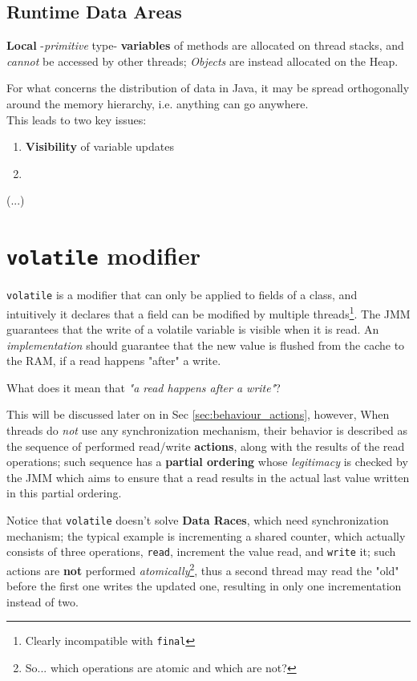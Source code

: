 \subsection{Runtime Data Areas}
\textbf{Local} {-}\textit{primitive} type{-} \textbf{variables} of methods are allocated on thread stacks,
and \textit{cannot} be accessed by other threads;
\textit{Objects} are instead allocated on the Heap. 
\nl

For what concerns the distribution of data in Java,
it may be spread orthogonally around the memory hierarchy, 
i.e. anything can go anywhere.\\
This leads to two key issues:
\begin{enumerate}
   \item \textbf{Visibility} of variable updates
   \item 
\end{enumerate}

(...)

\section{\texttt{volatile} modifier}
\lstinline|volatile| is a modifier that can only be applied to fields of a class,
and intuitively it declares that a field can be modified by multiple threads\footnote{Clearly incompatible with \lstinline|final|}.
The JMM guarantees that the write of a volatile variable is visible when it is read.
An \textit{implementation} should guarantee that the new value is flushed from the cache to the RAM, if a read happens "after" a write.

\begin{center}
   What does it mean that \textit{"a read happens after a write"}?
\end{center}
This will be discussed later on in Sec \ref{sec:behaviour_actions}, however,
When threads do \textit{not} use any synchronization mechanism,
their behavior is described as the sequence of performed read/write \textbf{actions},
along with the results of the read operations;
such sequence has a \textbf{partial ordering} whose \textit{legitimacy} is checked by the JMM
which aims to ensure that a read results in the actual last value written in this partial ordering.
\nl

Notice that \lstinline|volatile| doesn't solve \textbf{Data Races}, which need synchronization mechanism;
the typical example is incrementing a shared counter, which actually consists of three operations, \texttt{read}, increment the value read, and \texttt{write} it;
such actions are \textbf{not} performed \textit{atomically}\footnote{So... which operations are atomic and which are not?},
thus a second thread may read the "old" before the first one writes the updated one, 
resulting in only one incrementation instead of two.


